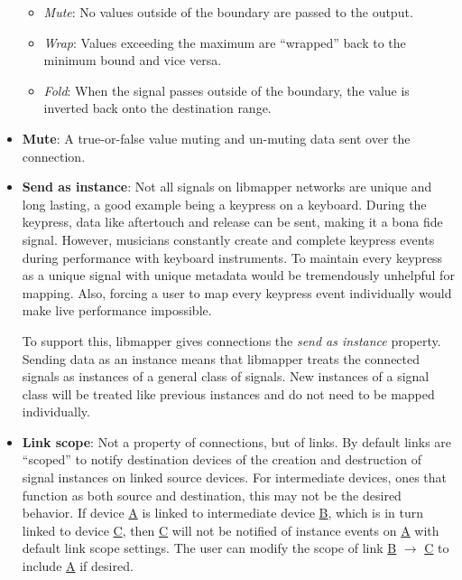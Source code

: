 \begin{itemize}
\begin{itemize}
		\item\emph{Mute}: No values outside of the boundary are passed to the output.
		\item\emph{Wrap}: Values exceeding the maximum are ``wrapped'' back to the minimum bound and vice versa.
		\item\emph{Fold}: When the signal passes outside of the boundary, the value is inverted back onto the destination range. 
	\end{itemize}
	\item\textbf{Mute}: A true-or-false value muting and un-muting data sent over the connection.
	\item\textbf{Send as instance}: Not all signals on libmapper networks are unique and long lasting, a good example being a keypress on a keyboard. During the keypress, data like aftertouch and release can be sent, making it a bona fide signal. However, musicians constantly create and complete keypress events during performance with keyboard instruments. To maintain every keypress as a unique signal with unique metadata would be tremendously unhelpful for mapping. Also, forcing a user to map every keypress event individually would make live performance impossible.

	To support this, libmapper gives connections the \emph{send as instance} property. Sending data as an instance means that libmapper treats the connected signals as instances of a general class of signals. New instances of a signal class will be treated like previous instances and do not need to be mapped individually.
	\item\textbf{Link scope}: Not a property of connections, but of links. By default links are ``scoped'' to notify destination devices of the creation and destruction of signal instances on linked source devices. For intermediate devices, ones that function as both source and destination, this may not be the desired behavior. If device \url{A} is linked to intermediate device \url{B}, which is in turn linked to device \url{C}, then \url{C} will not be notified of instance events on \url{A} with default link scope settings. The user can modify the scope of link \url{B} $\rightarrow$ \url{C} to include \url{A} if desired.

\end{itemize}


